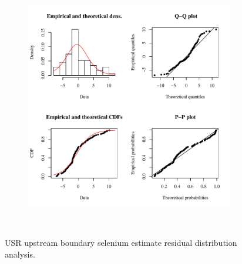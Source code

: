 \begin{linenumbers}
\begin{landscape}
\begin{figure}
\begin{subfigure}{0.7\textwidth}
			\includegraphics[width=\tableCustomSize]{"Figures/Results_USR/Stochastic/Conc Model res-fit WTP"}
		\end{subfigure}\\
		\caption{USR upstream boundary selenium estimate residual distribution analysis.}
	\end{figure}
\end{landscape}


\end{linenumbers}
